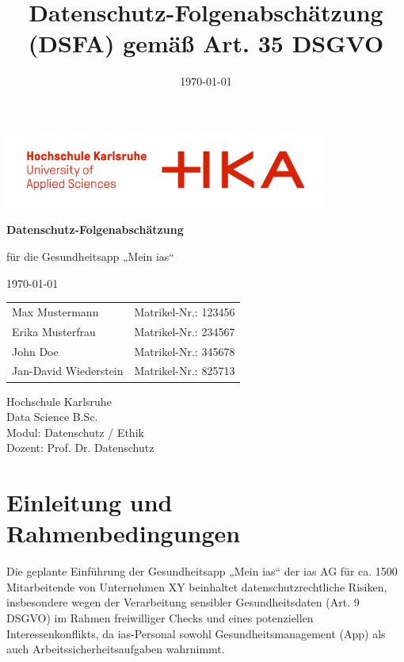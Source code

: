 \documentclass[12pt, a4paper]{article}
\title{Datenschutz-Folgenabschätzung (DSFA) gemäß Art. 35 DSGVO}
\author{}
\date{\today}
\begin{document}
\begin{titlepage}
    \centering
    
    \vfill 
    \includegraphics[width=0.8\textwidth]{logo.png}\par\vspace{1cm}
    
    {\Huge \bfseries Datenschutz-Folgenabschätzung\par} 
    
    \vspace{0.5cm}
    
    {\LARGE für die Gesundheitsapp „Mein ias“\par} 

    \vspace{0.5cm}

    {\large \today\par} 

    \vspace{1.5cm} 

    \large
    \begin{tabular}{l l}
        Max Mustermann & Matrikel-Nr.: 123456 \\
        Erika Musterfrau & Matrikel-Nr.: 234567 \\
        John Doe & Matrikel-Nr.: 345678 \\
        Jan-David Wiederstein & Matrikel-Nr.: 825713 \\
    \end{tabular}

    \vfill

    {\normalsize
    Hochschule Karlsruhe \\
    Data Science B.Sc. \\
    Modul: Datenschutz / Ethik \\
    Dozent: Prof. Dr. Datenschutz
    \par}
    
\end{titlepage}


\tableofcontents
\newpage



\section{Einleitung und Rahmenbedingungen}
Die geplante Einführung der Gesundheitsapp „Mein ias“ der ias AG für ca. 1500 Mitarbeitende von Unternehmen XY beinhaltet datenschutzrechtliche Risiken, insbesondere wegen der Verarbeitung sensibler Gesundheitsdaten (Art. 9 DSGVO) im Rahmen freiwilliger Checks und eines potenziellen Interessenkonflikts, da ias-Personal sowohl Gesundheitsmanagement (App) als auch Arbeitssicherheitsaufgaben wahrnimmt.
\end{document}

